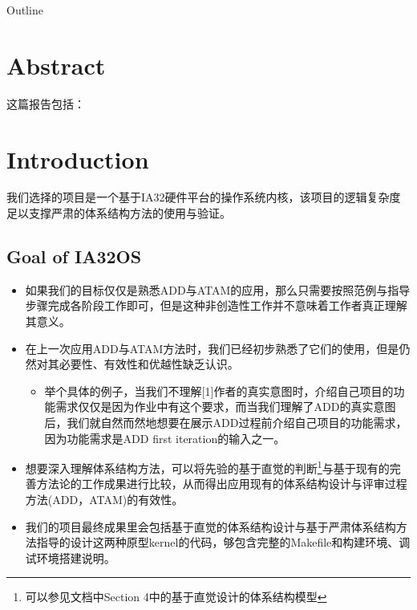 ﻿\documentclass{beamer}
\title[毕业论文答辩] 
{}
\subtitle
{}
\author[Author] 
{吴继鹏}
\institute[Universities of Somewhere and Elsewhere] 
{
  Software Institute\\
  Nanjing University
}
\date[AFP 2003]
{Architecture Final Presentations, 2014}
\begin{document}
\begin{frame}
  \titlepage
\end{frame}

\begin{frame}{Outline}
  \tableofcontents
\end{frame}

\section{Abstract}
\begin{frame}{这篇报告包括：}
  \begin{itemize}
  \end{itemize}
\end{frame}  

\section{Introduction}
\begin{frame}
  我们选择的项目是一个基于IA32硬件平台的操作系统内核，该项目的逻辑复杂度足以支撑严肃的体系结构方法的使用与验证。
\end{frame}
\subsection{Goal of IA32OS}
\begin{frame}
  \begin{itemize}
  \item 如果我们的目标仅仅是熟悉ADD与ATAM的应用，那么只需要按照范例与指导步骤完成各阶段工作即可，但是这种非创造性工作并不意味着工作者真正理解其意义。
  \item 在上一次应用ADD与ATAM方法时，我们已经初步熟悉了它们的使用，但是仍然对其必要性、有效性和优越性缺乏认识。
    \begin{itemize}
    \item 举个具体的例子，当我们不理解[1]作者的真实意图时，介绍自己项目的功能需求仅仅是因为作业中有这个要求，而当我们理解了ADD的真实意图后，我们就自然而然地想要在展示ADD过程前介绍自己项目的功能需求，因为功能需求是ADD first iteration的输入之一。
    \end{itemize}
  \end{itemize}
\end{frame}
\begin{frame}
  \begin{itemize}
  \item 想要深入理解体系结构方法，可以将先验的基于直觉的判断\footnote{可以参见文档中Section 4中的基于直觉设计的体系结构模型}与基于现有的完善方法论的工作成果进行比较，从而得出应用现有的体系结构设计与评审过程方法(ADD，ATAM)的有效性。
  \item 我们的项目最终成果里会包括基于直觉的体系结构设计与基于严肃体系结构方法指导的设计这两种原型kernel的代码，够包含完整的Makefile和构建环境、调试环境搭建说明。
  \end{itemize}
\end{frame}
\end{document}
